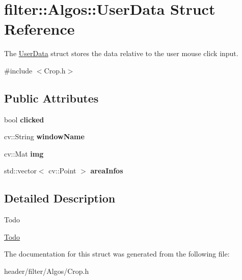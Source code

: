 \hypertarget{structfilter_1_1_algos_1_1_user_data}{}\section{filter\+:\+:Algos\+:\+:User\+Data Struct Reference}
\label{structfilter_1_1_algos_1_1_user_data}


The \hyperlink{structfilter_1_1_algos_1_1_user_data}{User\+Data} struct stores the data relative to the user mouse click input.  




{\ttfamily \#include $<$Crop.\+h$>$}

\subsection*{Public Attributes}
\begin{DoxyCompactItemize}
\item 
\mbox{\label{structfilter_1_1_algos_1_1_user_data_a623eb12c51d2d47c77eab79182913754}} 
bool {\bfseries clicked}
\item 
\mbox{\label{structfilter_1_1_algos_1_1_user_data_aaf4918ba6a93a1fff70aed979fe4387f}} 
cv\+::\+String {\bfseries window\+Name}
\item 
\mbox{\label{structfilter_1_1_algos_1_1_user_data_ac81783372d519767346602cda09aa356}} 
cv\+::\+Mat {\bfseries img}
\item 
\mbox{\label{structfilter_1_1_algos_1_1_user_data_aaac09f7c48505fa42922477003429e6e}} 
std\+::vector$<$ cv\+::\+Point $>$ {\bfseries area\+Infos}
\end{DoxyCompactItemize}


\subsection{Detailed Description}
\begin{DoxyRefDesc}{Todo}
\item[\hyperlink{todo__todo000002}{Todo}]\end{DoxyRefDesc}


The documentation for this struct was generated from the following file\+:\begin{DoxyCompactItemize}
\item 
header/filter/\+Algos/Crop.\+h\end{DoxyCompactItemize}
